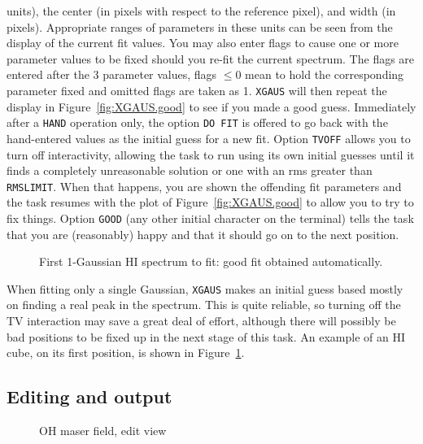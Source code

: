 \documentclass[twoside]{article}
\newcommand{\putfig}[1]{\texttt{[image: \#1.eps]}}
\begin{document}
units), the center (in pixels with respect to the reference pixel),
and width (in pixels).  Appropriate ranges of parameters in these
units can be seen from the display of the current fit values.  You may
also enter flags to cause one or more parameter values to be fixed
should you re-fit the current spectrum.  The flags are entered after
the 3 parameter values, flags $\leq 0$ mean to hold the corresponding
parameter fixed and omitted flags are taken as 1.  {\tt XGAUS} will
then repeat the display in Figure~\ref{fig:XGAUS.good} to see if you
made a good guess.  Immediately after a {\tt HAND} operation only, the
option {\tt DO FIT} is offered to go back with the hand-entered values
as the initial guess for a new fit.  Option {\tt TVOFF} allows you to
turn off interactivity, allowing the task to run using its own initial
guesses until it finds a completely unreasonable solution or one with
an rms greater than {\tt RMSLIMIT}\@.  When that happens, you are
shown the offending fit parameters and the task resumes with the plot
of Figure~\ref{fig:XGAUS.good} to allow you to try to fix things.
Option {\tt GOOD} (any other initial character on the terminal) tells
the task that you are (reasonably) happy and that it should go on to
the next position.

\begin{figure}
\begin{center}
\resizebox{6.0in}{!}{\putfig{XGAUS.HIgood}}
\caption{First 1-Gaussian HI spectrum to fit: good fit obtained
  automatically.}
\label{fig:XGAUS.HIgood}
\end{center}
\end{figure}

When fitting only a single Gaussian, {\tt XGAUS} makes an initial
guess based mostly on finding a real peak in the spectrum.  This is
quite reliable, so turning off the TV interaction may save a great
deal of effort, although there will possibly be bad positions to be
fixed up in the next stage of this task.  An example of an HI cube, on
its first position, is shown in Figure~\ref{fig:XGAUS.HIgood}.

\subsection{Editing and output}

\begin{figure}
\begin{center}
\resizebox{6.0in}{!}{\putfig{XGAUS.edit}}
\caption{OH maser field, edit view}
\label{fig:XGAUS.edit}
\end{center}
\end{figure}
\end{document}
